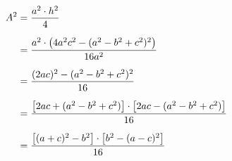 \documentclass[preview]{standalone}
\begin{document}
\begin{align*}
\special{dvisvgm:raw <g id='unique000'>}A^2 &= \frac{a^2 \cdot h^2}{4} \\[6pt] \special{dvisvgm:raw </g>}\special{dvisvgm:raw <g id='unique001'>}&= \frac{a^2 \cdot \bigl(4a^2c^2 - (a^2 - b^2 + c^2)^2\bigr)}{16a^2} \\[6pt] \special{dvisvgm:raw </g>}\special{dvisvgm:raw <g id='unique002'>}&= \frac{(2ac)^2 - (a^2 - b^2 + c^2)^2}{16} \\[6pt] \special{dvisvgm:raw </g>}\special{dvisvgm:raw <g id='unique003'>}&= \frac{\bigl[2ac + (a^2 - b^2 + c^2)\bigr]\cdot\bigl[2ac - (a^2 - b^2 + c^2)\bigr]}{16} \\[6pt] \special{dvisvgm:raw </g>}\special{dvisvgm:raw <g id='unique004'>}&= \frac{\bigl[(a + c)^2 - b^2\bigr]\cdot\bigl[b^2 - (a - c)^2\bigr]}{16}\special{dvisvgm:raw </g>}
\end{align*}
\end{document}
